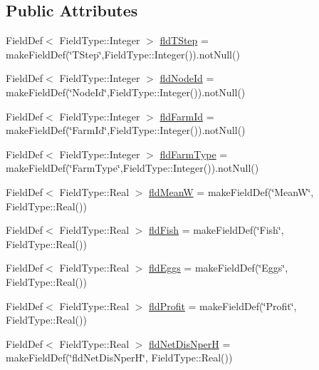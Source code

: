 \subsection*{Public Attributes}
\begin{DoxyCompactItemize}
\item 
Field\+Def$<$ Field\+Type\+::\+Integer $>$ \mbox{\hyperlink{class_fishfarms_table_a4e0a1838b9ee11546ce3826e3ecc1ebd}{fld\+T\+Step}} = make\+Field\+Def(\char`\"{}T\+Step\char`\"{},Field\+Type\+::\+Integer()).not\+Null()
\item 
Field\+Def$<$ Field\+Type\+::\+Integer $>$ \mbox{\hyperlink{class_fishfarms_table_acd269930a658c29defa28034644fe9c3}{fld\+Node\+Id}} = make\+Field\+Def(\char`\"{}Node\+Id\char`\"{},Field\+Type\+::\+Integer()).not\+Null()
\item 
Field\+Def$<$ Field\+Type\+::\+Integer $>$ \mbox{\hyperlink{class_fishfarms_table_a4a8043cc9d52002aeb28c04841080e82}{fld\+Farm\+Id}} = make\+Field\+Def(\char`\"{}Farm\+Id\char`\"{},Field\+Type\+::\+Integer()).not\+Null()
\item 
Field\+Def$<$ Field\+Type\+::\+Integer $>$ \mbox{\hyperlink{class_fishfarms_table_ac79c9ee3fb7bbe92ff4a2e327bec3010}{fld\+Farm\+Type}} = make\+Field\+Def(\char`\"{}Farm\+Type\char`\"{},Field\+Type\+::\+Integer()).not\+Null()
\item 
Field\+Def$<$ Field\+Type\+::\+Real $>$ \mbox{\hyperlink{class_fishfarms_table_a2b69aea64e8ab7150d6ceb922a671e72}{fld\+MeanW}} = make\+Field\+Def(\char`\"{}MeanW\char`\"{}, Field\+Type\+::\+Real())
\item 
Field\+Def$<$ Field\+Type\+::\+Real $>$ \mbox{\hyperlink{class_fishfarms_table_aa614995248d0c6adf89ff17bc717c107}{fld\+Fish}} = make\+Field\+Def(\char`\"{}Fish\char`\"{}, Field\+Type\+::\+Real())
\item 
Field\+Def$<$ Field\+Type\+::\+Real $>$ \mbox{\hyperlink{class_fishfarms_table_abb4170c921f4bcf9a734f33d00cdb019}{fld\+Eggs}} = make\+Field\+Def(\char`\"{}Eggs\char`\"{}, Field\+Type\+::\+Real())
\item 
Field\+Def$<$ Field\+Type\+::\+Real $>$ \mbox{\hyperlink{class_fishfarms_table_a6c476e6f46c61cd32e233f56f91d3a6f}{fld\+Profit}} = make\+Field\+Def(\char`\"{}Profit\char`\"{}, Field\+Type\+::\+Real())
\item 
Field\+Def$<$ Field\+Type\+::\+Real $>$ \mbox{\hyperlink{class_fishfarms_table_ae892ef91c5435a0184f8b15078831764}{fld\+Net\+Dis\+NperH}} = make\+Field\+Def(\char`\"{}fld\+Net\+Dis\+NperH\char`\"{}, Field\+Type\+::\+Real())
\item 

\end{DoxyCompactItemize}
